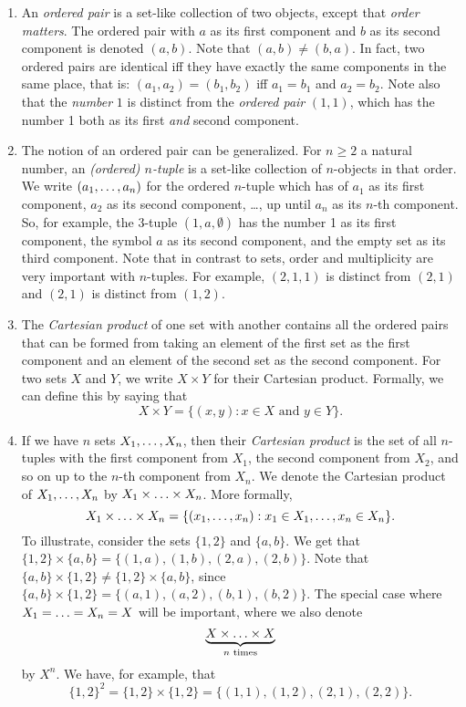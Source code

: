 \begin{enumerate}[\thesection.1]


\item An \emph{ordered pair} is a set-like collection of two objects, except that \emph{order matters}. The ordered pair with $a$ as its first component and $b$ as its second component is denoted $(a,b)$. Note that $(a,b)\neq (b,a)$. In fact, two ordered pairs are identical iff they have exactly the same components in the same place, that is: $(a_1,a_2)=(b_1, b_2)$ iff $a_1=b_1$ and $a_2=b_2$. Note also that the \emph{number} $1$ is distinct from the \emph{ordered pair} $(1,1)$, which has the number 1 both as its first \emph{and} second component.

\item The notion of an ordered pair can be generalized. For $n\geq 2$ a natural number, an \emph{(ordered) $n$-tuple} is a set-like collection of $n$-objects in that order. We write $(a_1, \mathellipsis, a_n)$ for the ordered $n$-tuple which has of $a_1$ as its first component, $a_2$ as its second component, \dots, up until $a_n$ as its $n$-th component. So, for example, the 3-tuple $(1,a,\emptyset)$ has the number 1 as its first component, the symbol $a$ as its second component, and the empty set as its third component. Note that in contrast to sets, order and multiplicity are very important with $n$-tuples. For example, $(2,1,1)$ is distinct from $(2,1)$ and $(2,1)$ is distinct from $(1,2)$.

\item The \emph{Cartesian product} of one set with another contains all the ordered pairs that can be formed from taking an element of the first set as the first component and an element of the second set as the second component. For two sets $X$ and $Y$, we write $X\times Y$ for their Cartesian product. Formally, we can define this by saying that \[X\times Y=\{(x,y):x\in X\text{ and }y\in Y\}.\]

\item If we have $n$ sets $X_1, \mathellipsis, X_n$, then their \emph{Cartesian product} is the set of all $n$-tuples with the first component from $X_1$, the second component from $X_2$, and so on up to the $n$-th component from $X_n$. We denote the Cartesian product of $X_1, \mathellipsis, X_n$ by $X_1\times \mathellipsis\times X_n$. More formally, \[X_1\times \mathellipsis\times X_n=\{(x_1, \mathellipsis, x_n):x_1\in X_1, \mathellipsis, x_n\in X_n\}.\] To illustrate, consider the sets $\{1,2\}$ and $\{a,b\}$. We get that $\{1,2\}\times\{a,b\}=\{(1,a), (1,b), (2,a), (2,b)\}$. Note that $\{a,b\}\times \{1,2\}\neq \{1,2\}\times \{a,b\}$, since $\{a,b\}\times \{1,2\}=\{(a,1), (a,2), (b,1), (b,2)\}$. The special case where $X_1=\mathellipsis=X_n=X$ will be important, where we also denote \[\underbrace{X\times\mathellipsis\times X}_{n\text{ times}}\] by $X^n$. We have, for example, that \[\{1,2\}^2=\{1,2\}\times\{1,2\}=\{(1,1), (1,2), (2,1), (2,2)\}.\]

\end{enumerate}


